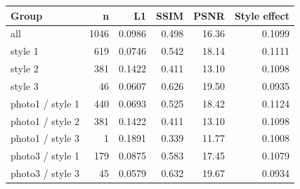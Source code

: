 \begin{tabular}{lrrrrr}
\hline
Group & n & L1 & SSIM & PSNR & Style effect \\
\hline
all & 1046 & 0.0986 & 0.498 & 16.36 & 0.1099 \\
style 1 & 619 & 0.0746 & 0.542 & 18.14 & 0.1111 \\
style 2 & 381 & 0.1422 & 0.411 & 13.10 & 0.1098 \\
style 3 & 46 & 0.0607 & 0.626 & 19.50 & 0.0935 \\
photo1 / style 1 & 440 & 0.0693 & 0.525 & 18.42 & 0.1124 \\
photo1 / style 2 & 381 & 0.1422 & 0.411 & 13.10 & 0.1098 \\
photo1 / style 3 & 1 & 0.1891 & 0.339 & 11.77 & 0.1008 \\
photo3 / style 1 & 179 & 0.0875 & 0.583 & 17.45 & 0.1079 \\
photo3 / style 3 & 45 & 0.0579 & 0.632 & 19.67 & 0.0934 \\
\hline
\end{tabular}
